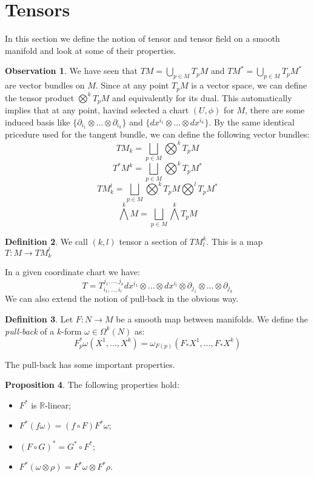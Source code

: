 \documentclass[12pt,a4paper]{report}
\theoremstyle{definition}
\newtheorem{Def}{Definition}[chapter]
\theoremstyle{Theorem}
\newtheorem{Prop}[Def]{Proposition}
\theoremstyle{break}
\theoremstyle{definition}
\newtheorem{Obs}[Def]{Observation}
\begin{document}
		\section{Tensors}
		In this section we define the notion of tensor and tensor field on a smooth manifold and look at some of their properties.
		\begin{Obs}
			We have seen that $TM=\bigcup_{p\in M}T_pM$ and $TM^*=\bigcup_{p\in M}T_pM^*$ are vector bundles on $M$. Since at any point $T_pM$ is a vector space, we can define the tensor product $\bigotimes^k T_pM$ and equivalently for its dual. This automatically implies that at any point, havind selected a chart $(U,\phi)$ for $M$, there are some induced basis like $\{\partial_{i_1}\otimes...\otimes \partial_{i_k}\}$ and $\{dx^{i_1}\otimes...\otimes dx^{i_k}\}$. By the same identical pricedure used for the tangent bundle, we can define the following vector bundles:
			$$TM_k=\bigsqcup_{p\in M} \bigotimes^k T_pM$$
			$$ T^*M^k=\bigsqcup_{p\in M} \bigotimes^k T_pM^*$$
			$$TM^l_k=\bigsqcup_{p\in M} \bigotimes^k T_pM\bigotimes^l T_pM^*$$
			$$\bigwedge^k M=\bigsqcup_{p\in M} \bigwedge^k T_pM$$
		\end{Obs}
		\begin{Def}
			We call $(k,l)$ tensor a section of $TM^k_l$. This is a map $T:M\rightarrow TM^l_k$
		\end{Def}
		In a given coordinate chart we have:
		$$T=T_{i_1,...,i_l}^{j_1,...,j_k}dx^{i_1}\otimes...\otimes  dx^{i_l}\otimes \partial_{j_1}\otimes...\otimes \partial_{j_k}$$
		We can also extend the notion of pull-back in the obvious way.
		\begin{Def}
			Let $F:N\rightarrow M$ be a smooth map between manifolds. We define the \textit{pull-back} of a $k$-form $\omega\in\Omega^k(N)$ as:
			$$F^*_p\omega (X^1,...,X^k)=\omega_{F(p)}(F_*X^1,...,F_*X^k)$$
		\end{Def}
		The pull-back has some important properties.
		\begin{Prop}
			The following properties hold:
			\begin{itemize}
				\item[(1)] $F^*$ is $\mathbb{R}$-linear;
				\item[(2)] $F^*(f\omega)=(f\circ F)F^*\omega$;
				\item[(3)] $(F\circ G)^*=G^*\circ F^*$;
				\item[(4)] $F^*(\omega\otimes \rho)=F^*\omega\otimes F^*\rho$.
			\end{itemize}
		\end{Prop}
\end{document}
